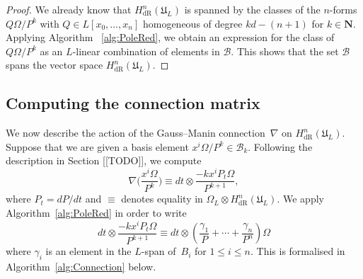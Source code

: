 \documentclass[a4paper,11pt]{article}
\numberwithin{equation}{section}
\newcommand{\NN}{\mathbf{N}} %
\providecommand{\HdR}{H_{\text{dR}}}    %
\providecommand{\cB}{\mathcal{B}} %
\theoremstyle{definition}
\begin{document}
\begin{proof}
We already know that $\HdR^n(\mathfrak{U}_L)$ is spanned by the classes of the 
$n$-forms $Q \Omega / P^k$ with $Q \in L[x_0, \dotsc, x_n]$ homogeneous of degree 
$kd - (n+1)$ for $k \in \NN$. Applying Algorithm ~\ref{alg:PoleRed}, we obtain an 
expression for the class of $Q \Omega / P^k$ as an $L$-linear combination of 
elements in $\cB$.  This shows that the set $\cB$ spans the vector space 
$\HdR^n(\mathfrak{U}_L)$.


\end{proof}


\subsection{Computing the connection matrix}
\label{sec:Connection}

We now describe the action of the Gauss--Manin connection~$\nabla$ on 
$\HdR^n(\mathfrak{U}_L)$.  Suppose that we are given a basis element 
$x^i \Omega / P^k \in \cB_k$.  Following the description in Section [[TODO]], 
we compute
\begin{equation} \label{eqn:nabla}
\nabla \biggl(\frac{x^i \Omega}{P^k}\biggr) \equiv 
dt \otimes \frac{- k x^i P_t \Omega}{P^{k+1}},
\end{equation}
where $P_t = dP/dt$ and $\equiv$ denotes equality in 
$\Omega_{L} \otimes \HdR^n(\mathfrak{U}_L)$. We apply 
Algorithm~\ref{alg:PoleRed} in order to write
\begin{equation}
dt \otimes \frac{- k x^i P_t \Omega}{P^{k+1}} \equiv 
dt \otimes \left( \frac{\gamma_{1}}{P} + \dotsb + \frac{\gamma_n}{P^n} \right) \Omega
\end{equation}
where $\gamma_i$ is an element in the $L$-span of~$B_i$ for $1 \leq i \leq n$. This is
formalised in Algorithm~\ref{alg:Connection} below.
\end{document}
